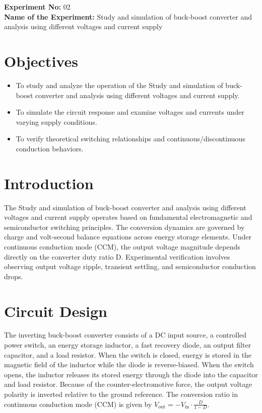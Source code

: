 \documentclass[12pt,a4paper]{article}
\begin{document}
\setcounter{page}{1}
\rmfamily %
\normalsize

\begin{center}
    \textbf{Experiment No:} 02 \\
    \vspace{0.2cm}
    \textbf{Name of the Experiment:} Study and simulation of buck-boost converter and analysis using different voltages and current supply
\end{center}
\vspace{0.5cm}


\section{Objectives}
\begin{itemize}

    \item To study and analyze the operation of the Study and simulation of buck-boost converter and analysis using different voltages and current supply.

    \item To simulate the circuit response and examine voltages and currents under varying supply conditions.

    \item To verify theoretical switching relationships and continuous/discontinuous conduction behaviors.

\end{itemize}


\section{Introduction}
The Study and simulation of buck-boost converter and analysis using different voltages and current supply operates based on fundamental electromagnetic and semiconductor switching principles. The conversion dynamics are governed by charge and volt-second balance equations across energy storage elements. Under continuous conduction mode (CCM), the output voltage magnitude depends directly on the converter duty ratio D. Experimental verification involves observing output voltage ripple, transient settling, and semiconductor conduction drops.



\section{Circuit Design}
The inverting buck-boost converter consists of a DC input source, a controlled power switch, an energy storage inductor, a fast recovery diode, an output filter capacitor, and a load resistor. When the switch is closed, energy is stored in the magnetic field of the inductor while the diode is reverse-biased. When the switch opens, the inductor releases its stored energy through the diode into the capacitor and load resistor. Because of the counter-electromotive force, the output voltage polarity is inverted relative to the ground reference. The conversion ratio in continuous conduction mode (CCM) is given by $V_{\text{out}} = -V_{\text{in}} \cdot \frac{D}{1 - D}$.
\end{document}
